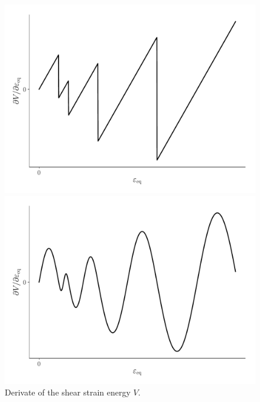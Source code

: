 \documentclass[times,namecite]{goose-article}
\begin{document}
\begin{figure}[htp]
  \centering
  \captionsetup[subfigure]{justification=centering}
  \begin{minipage}[t]{.49\textwidth}
    \centering
    \includegraphics[width=1.\textwidth]{potential_dV-plas}
  \end{minipage}
  \hfill
  \begin{minipage}[t]{.49\textwidth}
    \centering
    \includegraphics[width=1.\textwidth]{potential_dV-plas-smooth}
  \end{minipage}
  \caption{Derivate of the shear strain energy $V$.}
  \label{fig:dV-plas}
\end{figure}
\end{document}
